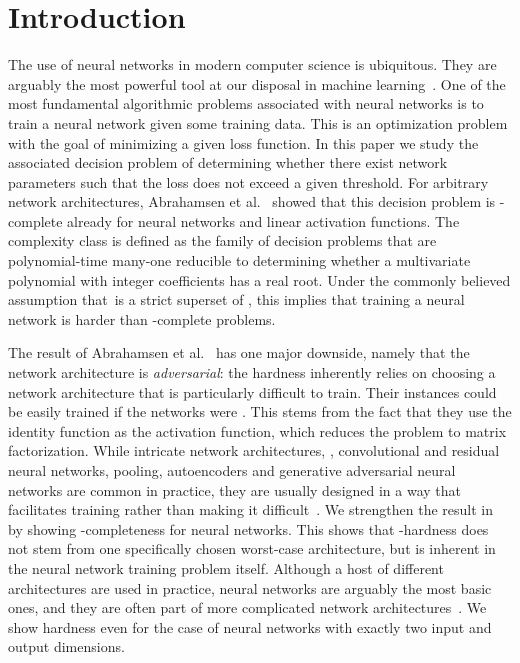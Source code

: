 
\section{Introduction}
The %
use  %
of neural networks in modern computer science is ubiquitous.
They are arguably the most powerful tool at our
%
disposal  %
in machine learning~\cite{Goodfellow2016_DeepLearning}.
One of the most fundamental algorithmic problems associated with neural networks is to
train a neural network given some training data. 
%
This is an optimization problem with the goal of minimizing a given loss function.
In this paper we study the associated decision problem of determining whether there exist network
parameters such that the loss does not exceed a given threshold.
%
For arbitrary network architectures, Abrahamsen et al.~\cite{Abrahamsen2021_NeuralNetworks}
showed that 
%
this decision
%
%
%
%
problem is \ER-complete already for \twolayer neural networks and linear activation functions.
%
%
%
%
%
The complexity class \ER is defined as the family of decision problems that are polynomial-time
many-one reducible to determining whether a multivariate polynomial with integer coefficients
has a real root.
%
%
%
%
%
Under the commonly believed assumption that~\ER is a strict superset of \NP, 
%
%
%
%
this implies that training a neural network is harder than \NP-complete problems.

The result of Abrahamsen et al.~\cite{Abrahamsen2021_NeuralNetworks} has one major
downside, namely that the network architecture is \emph{adversarial}:
%
the  %
hardness inherently relies on choosing a network architecture that is particularly
difficult to train.
Their instances could be easily trained if the networks were \fullyconnected.
This stems from the fact that they use the identity function as the activation function,
which reduces the problem to matrix factorization.
While intricate network architectures, \eg, convolutional and residual neural networks, pooling, autoencoders and generative adversarial neural networks are common in practice, they are usually designed in a way that facilitates training rather than making it difficult~\cite{Goodfellow2016_DeepLearning}.
We strengthen the result in~\cite{Abrahamsen2021_NeuralNetworks} by showing \ER-completeness for \emph{\fullyconnected} \twolayer neural networks.
This shows that \ER-hardness does not stem from one specifically chosen worst-case architecture, but is inherent in the neural network training problem itself.
Although a host of different architectures are used in practice, \fullyconnected \twolayer neural networks are arguably the most basic ones, and they are often part of more complicated network architectures~\cite{Goodfellow2016_DeepLearning}.
We show hardness even for the case of \fullyconnected \twolayer \ReLU neural networks with exactly two input and output dimensions.

